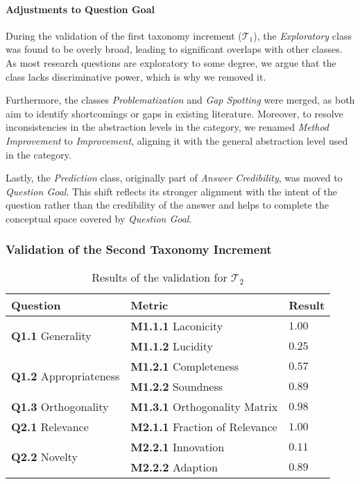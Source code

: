 \paragraph{Adjustments to Question Goal}
During the validation of the first taxonomy increment ($\mathcal{T}_1$), the \emph{Exploratory} class was found to be overly broad, leading to significant overlaps with other classes. As most research questions are exploratory to some degree, we argue that the class lacks discriminative power, which is why we removed it.

Furthermore, the classes \emph{Problematization} and \emph{Gap Spotting} were merged, as both aim to identify shortcomings or gaps in existing literature. Moreover, to resolve inconsistencies in the abstraction levels in the category, we renamed \emph{Method Improvement} to \emph{Improvement}, aligning it with the general abstraction level used in the category.

Lastly, the \emph{Prediction} class, originally part of \emph{Answer Credibility}, was moved to \emph{Question Goal}. This shift reflects its stronger alignment with the intent of the question rather than the credibility of the answer and helps to complete the conceptual space covered by \emph{Question Goal}.

\subsubsection{Validation of the Second Taxonomy Increment}

\begin{table}[t]
\centering
\begin{tabular}{@{}lll@{}}
\toprule
\textbf{Question} & \textbf{Metric} & \textbf{Result}\\ 
    \midrule
    \multirow{2}{*}{\textbf{Q1.1} Generality} & \textbf{M1.1.1} Laconicity & $1.00$ \\
    & \textbf{M1.1.2} Lucidity & $0.25$ \\ 
    
    \multirow{2}{*}{\textbf{Q1.2} Appropriateness} & \textbf{M1.2.1} Completeness & $0.57$ \\
    & \textbf{M1.2.2} Soundness & $0.89$ \\ 
    
    \textbf{Q1.3} Orthogonality & \textbf{M1.3.1} Orthogonality Matrix & $0.98$\\

    \textbf{Q2.1} Relevance & \textbf{M2.1.1} Fraction of Relevance & $1.00$ \\
    
    \multirow{2}{*}{\textbf{Q2.2} Novelty} & \textbf{M2.2.1} Innovation & $0.11$\\
    & \textbf{M2.2.2} Adaption & $0.89$\\
    \bottomrule
\end{tabular}%
\caption[Validation Results of the Second Taxonomy Increment]{Results of the validation for $\mathcal{T}_2$}
\label{tab:validation_t2}
\end{table}

